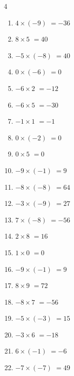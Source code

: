 \begin{multicols}{4}
\begin{enumerate}
  \item $4\times (-9)$
        $=-36$

  \item $8\times 5$
        $=40$

  \item $-5\times (-8)$
        $=40$

  \item $0\times (-6)$
        $=0$

  \item $-6\times 2$
        $=-12$

  \item $-6\times 5$
        $=-30$

  \item $-1\times 1$
        $=-1$

  \item $0\times (-2)$
        $=0$

  \item $0\times 5$
        $=0$

  \item $-9\times (-1)$
        $=9$

  \item $-8\times (-8)$
        $=64$

  \item $-3\times (-9)$
        $=27$

  \item $7\times (-8)$
        $=-56$

  \item $2\times 8$
        $=16$

  \item $1\times 0$
        $=0$

  \item $-9\times (-1)$
        $=9$

  \item $8\times 9$
        $=72$

  \item $-8\times 7$
        $=-56$

\columnbreak %

\resetques

  \item $-5\times (-3)$
        $=15$

  \item $-3\times 6$
        $=-18$

  \item $6\times (-1)$
        $=-6$

  \item $-7\times (-7)$
        $=49$


\end{enumerate}
\end{multicols}
